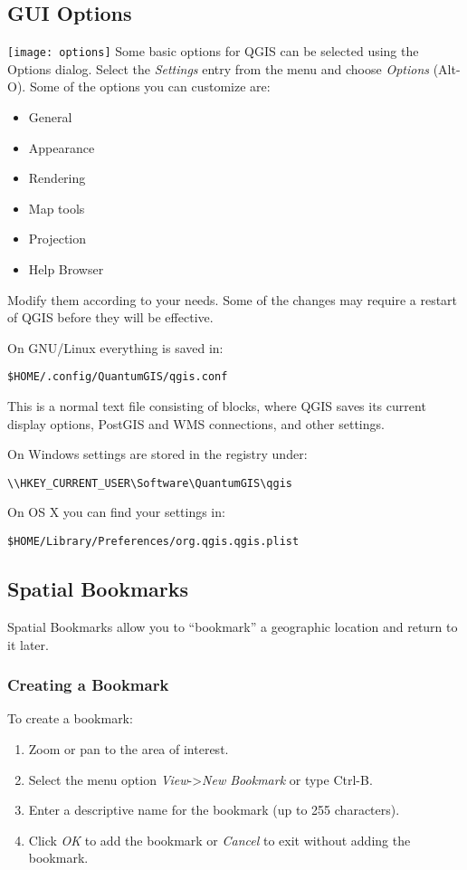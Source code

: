 \subsection{GUI Options}
\label{subsec:gui_options}
\texttt{[image: options]} Some basic options for QGIS
can be selected using the Options dialog. Select the \textsl{Settings} entry
from the menu and choose \textsl{Options} (Alt-O). Some of the options you can customize are:
\begin{itemize}
\item General
\item Appearance
\item Rendering
\item Map tools
\item Projection
\item Help Browser
\end{itemize}
Modify them according to your needs. Some of the changes may require a restart of QGIS before they will be effective.

On GNU/Linux everything is saved in:
\begin{verbatim}
$HOME/.config/QuantumGIS/qgis.conf
\end{verbatim}
This is a normal text file consisting of blocks, where QGIS saves its current
display options, PostGIS and WMS connections, and other settings.

On Windows settings are stored in the registry under:
\begin{verbatim}
\\HKEY_CURRENT_USER\Software\QuantumGIS\qgis
\end{verbatim}

On OS X you can find your settings in:
\begin{verbatim}
$HOME/Library/Preferences/org.qgis.qgis.plist
\end{verbatim}


\subsection{Spatial Bookmarks}\label{sec:bookmarks}

Spatial Bookmarks allow you to ``bookmark'' a geographic location and return to it later.

\subsubsection{Creating a Bookmark}
To create a bookmark:
\begin{enumerate}
\item Zoom or pan to the area of interest.
\item Select the menu option \textit{View}->\textit{New Bookmark} or type Ctrl-B.
\item Enter a descriptive name for the bookmark (up to 255 characters).
\item Click \textit{OK} to add the bookmark or \textit{Cancel} to exit without adding the bookmark.
\end{enumerate}

